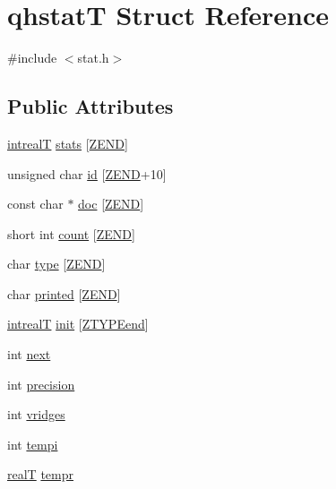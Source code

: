\hypertarget{structqhstatT}{}\section{qhstat\+T Struct Reference}
\label{structqhstatT}


{\ttfamily \#include $<$stat.\+h$>$}

\subsection*{Public Attributes}
\begin{DoxyCompactItemize}
\item 
\hyperlink{unionintrealT}{intreal\+T} \hyperlink{structqhstatT_a55645fb57f12f2c157301b104deea911}{stats} \mbox{[}\hyperlink{spatial_2qhull_2src_2stat_8h_a0bb9ced98effdb433e3e2fafd98932fdacc1aeb24e409a582092fe083d9ea1e41}{Z\+E\+N\+D}\mbox{]}
\item 
unsigned char \hyperlink{structqhstatT_aa05bc1cbbe3702df082daa7556f069d7}{id} \mbox{[}\hyperlink{spatial_2qhull_2src_2stat_8h_a0bb9ced98effdb433e3e2fafd98932fdacc1aeb24e409a582092fe083d9ea1e41}{Z\+E\+N\+D}+10\mbox{]}
\item 
const char $\ast$ \hyperlink{structqhstatT_a15218d42b7a84251f44a667cd21484b4}{doc} \mbox{[}\hyperlink{spatial_2qhull_2src_2stat_8h_a0bb9ced98effdb433e3e2fafd98932fdacc1aeb24e409a582092fe083d9ea1e41}{Z\+E\+N\+D}\mbox{]}
\item 
short int \hyperlink{structqhstatT_a57e528b84cdf2ab8ce962b82c210d9f7}{count} \mbox{[}\hyperlink{spatial_2qhull_2src_2stat_8h_a0bb9ced98effdb433e3e2fafd98932fdacc1aeb24e409a582092fe083d9ea1e41}{Z\+E\+N\+D}\mbox{]}
\item 
char \hyperlink{structqhstatT_af164023aa67dd674a17c39bf1d7b0b6c}{type} \mbox{[}\hyperlink{spatial_2qhull_2src_2stat_8h_a0bb9ced98effdb433e3e2fafd98932fdacc1aeb24e409a582092fe083d9ea1e41}{Z\+E\+N\+D}\mbox{]}
\item 
char \hyperlink{structqhstatT_a4c0b9243aecc6f97b34ad8c0be821327}{printed} \mbox{[}\hyperlink{spatial_2qhull_2src_2stat_8h_a0bb9ced98effdb433e3e2fafd98932fdacc1aeb24e409a582092fe083d9ea1e41}{Z\+E\+N\+D}\mbox{]}
\item 
\hyperlink{unionintrealT}{intreal\+T} \hyperlink{structqhstatT_a3c16ecdc2010f168040b936cdb801756}{init} \mbox{[}\hyperlink{spatial_2qhull_2src_2stat_8h_a6c58d6d683698a3e7886533dc3241ca7a0e4e54ca92c802f645e777a8a47f248e}{Z\+T\+Y\+P\+Eend}\mbox{]}
\item 
int \hyperlink{structqhstatT_a27d020e3dadf203e6d5b791b42589456}{next}
\item 
int \hyperlink{structqhstatT_ac74817d4cf3646f45952d03e22ad2d48}{precision}
\item 
int \hyperlink{structqhstatT_aeefa63828da865434ad1864a60e85786}{vridges}
\item 
int \hyperlink{structqhstatT_ac50f6a9da9b4c583487476997b95cc8b}{tempi}
\item 
\hyperlink{user_8h_ad6fe71dff955732ea8682263e9540bb7}{real\+T} \hyperlink{structqhstatT_a198f214cd07ea167642472099b600d6e}{tempr}
\end{DoxyCompactItemize}


